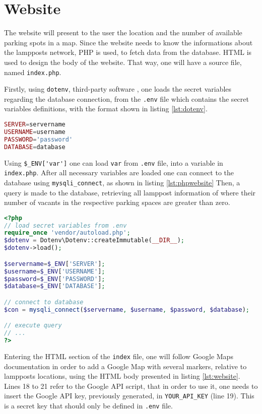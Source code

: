 \clearpage
\section{Website}
The website will present to the user the location and the number of available parking spots in a map. Since the website needs to know the informations about the lampposts network, PHP is used, to fetch data from the database. HTML is used to design the body of the website. That way, one will have a source file, named \verb|index.php|.

Firstly, using \verb|dotenv|, third-party software \cite{phpdotenv}, one loads the secret variables regarding the database connection, from the \verb|.env| file which contains the secret variables definitions, with the format shown in listing \ref{lst:dotenv}.

\begin{lstlisting}[language=php, caption={.env file example.}, label={lst:dotenv}]
SERVER=servername
USERNAME=username
PASSWORD='password'
DATABASE=database
\end{lstlisting}

Using \verb|$_ENV['var']| one can load \verb|var| from \verb|.env| file, into a variable in \verb|index.php|. After all necessary variables are loaded one can connect to the database using \verb|mysqli_connect|, as shown in listing \ref{lst:phpwebsite} Then, a query is made to the database, retrieving all lamppost information of where their number of vacants in the respective parking spaces are greater than zero.

\begin{lstlisting}[language=php, caption={Create PHP connection to the database.}, label={lst:phpwebsite}]
<?php
// load secret variables from .env
require_once 'vendor/autoload.php';
$dotenv = Dotenv\Dotenv::createImmutable(__DIR__);
$dotenv->load();

$servername=$_ENV['SERVER'];
$username=$_ENV['USERNAME'];
$password=$_ENV['PASSWORD'];
$database=$_ENV['DATABASE'];

// connect to database
$con = mysqli_connect($servername, $username, $password, $database);

// execute query
// ...
?>
\end{lstlisting}

Entering the HTML section of the \verb|index| file, one will follow Google Maps documentation \cite{mapsdoc} in order to add a Google Map with several markers, relative to lampposts locations, using the HTML body presented in listing \ref{lst:website}. Lines 18 to 21 refer to the Google API script, that in order to use it, one needs to insert the Google API key, previously generated, in \verb|YOUR_API_KEY| (line 19). This is a secret key that should only be defined in \verb|.env| file. 


